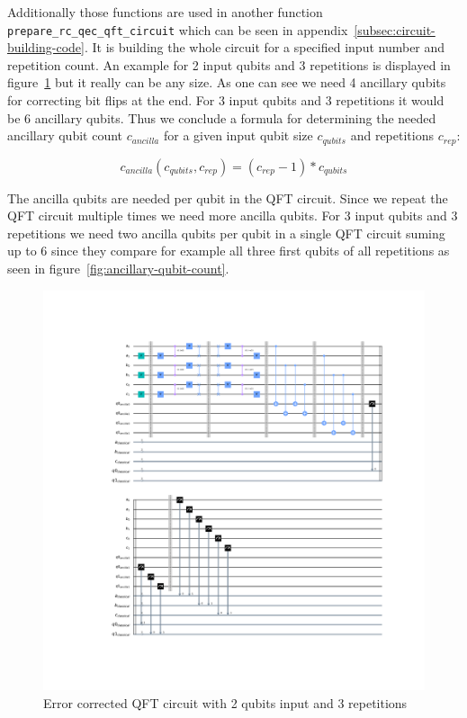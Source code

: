 Additionally those functions are used in another function \texttt{prepare\_rc\_qec\_qft\_circuit} which can be seen in appendix~\ref{subsec:circuit-building-code}.
It is building the whole circuit for a specified input number and repetition count.
An example for 2 input qubits and 3 repetitions is displayed in figure~\ref{fig:example-error-correction-circuit} but it really can be any size.
As one can see we need 4 ancillary qubits for correcting bit flips at the end.
For 3 input qubits and 3 repetitions it would be 6 ancillary qubits.
Thus we conclude a formula for determining the needed ancillary qubit count \(c_{ancilla}\) for a given input qubit size \(c_{qubits}\) and repetitions \(c_{rep}\):

\[
    c_{ancilla}(c_{qubits}, c_{rep}) = (c_{rep} - 1) * c_{qubits}
\]

The ancilla qubits are needed per qubit in the QFT circuit.
Since we repeat the QFT circuit multiple times we need more ancilla qubits.
For 3 input qubits and 3 repetitions we need two ancilla qubits per qubit in a single QFT circuit suming up to 6 since they compare for example all three first qubits of all repetitions as seen in figure~\ref{fig:ancillary-qubit-count}.

\begin{figure}
    \centering
    \includegraphics[width=\textwidth]{res/example-error-correction-circuit.pdf}
    \caption{Error corrected QFT circuit with 2 qubits input and 3 repetitions}
    \label{fig:example-error-correction-circuit}
\end{figure}

